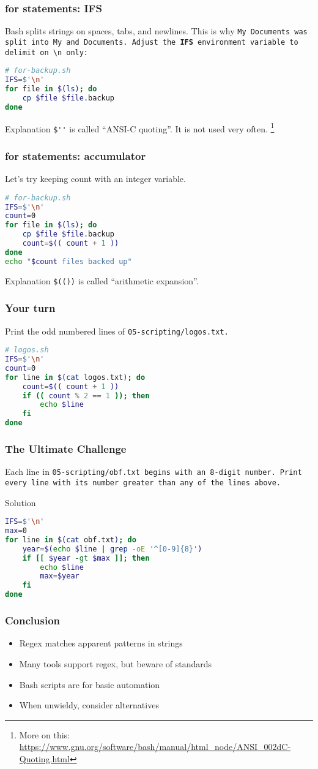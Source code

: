 \begin{frame}[fragile]
\frametitle{\textbf{for} statements: IFS}
Bash splits strings on spaces, tabs, and newlines.
This is why \tt{My Documents} was split into \tt{My} and \tt{Documents}.
\newline \newline
Adjust the \textbf{IFS} environment variable to delimit on \verb|\n| only:
\begin{lstlisting}[language=bash]
# for-backup.sh
IFS=$'\n'
for file in $(ls); do
    cp $file $file.backup
done
\end{lstlisting}
\begin{block}{Explanation}
    \verb|$''| is called ``ANSI-C quoting''. It is not used very often.
    \footnote{
        More on this:
        \url{https://www.gnu.org/software/bash/manual/html_node/ANSI_002dC-Quoting.html}
    }
\end{block}
\end{frame}

\begin{frame}[fragile]
\frametitle{\textbf{for} statements: accumulator}
Let's try keeping count with an integer variable.
\begin{lstlisting}[language=bash]
# for-backup.sh
IFS=$'\n'
count=0
for file in $(ls); do
    cp $file $file.backup
    count=$(( count + 1 ))
done
echo "$count files backed up"
\end{lstlisting}
\begin{block}{Explanation}
    \verb|$(())| is called ``arithmetic expansion''.
\end{block}
\end{frame}

\begin{frame}[fragile]
\frametitle{Your turn}
Print the odd numbered lines of \tt{05-scripting/logos.txt}.
\pause
\begin{lstlisting}[language=bash]
# logos.sh
IFS=$'\n'
count=0
for line in $(cat logos.txt); do
	count=$(( count + 1 ))
	if (( count % 2 == 1 )); then
		echo $line
	fi
done
\end{lstlisting}
\end{frame}

\begin{frame}[fragile]
\frametitle{The Ultimate Challenge}
Each line in \tt{05-scripting/obf.txt} begins with an 8-digit number.
Print every line with its number greater than any of the lines above.
\pause
\begin{block}{Solution}
\begin{lstlisting}[language=bash]
IFS=$'\n'
max=0
for line in $(cat obf.txt); do
	year=$(echo $line | grep -oE '^[0-9]{8}')
    if [[ $year -gt $max ]]; then
		echo $line
		max=$year
	fi
done
\end{lstlisting}
\end{block}
\end{frame}

\begin{frame}
\frametitle{Conclusion}
\begin{itemize}
    \item Regex matches apparent patterns in strings
    \item Many tools support regex, but beware of standards
    \item Bash scripts are for basic automation
    \item When unwieldy, consider alternatives
\end{itemize}
\end{frame}
